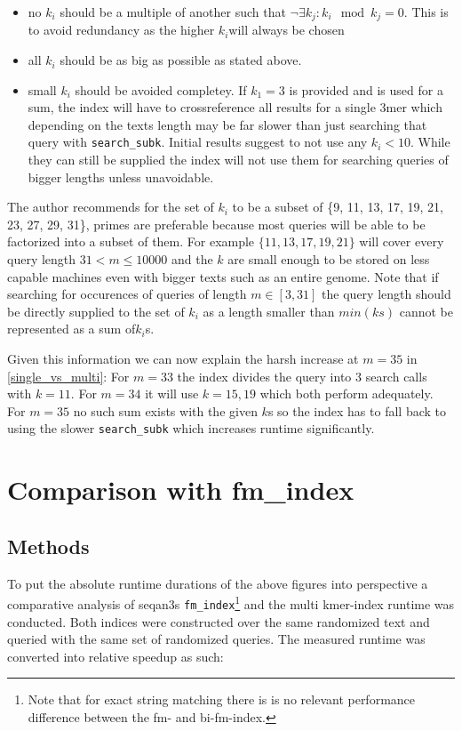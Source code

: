 \begin{itemize}
\item no $k_{i}$ should be a multiple of another such that $\lnot\exists k_{j}:k_{i}\mod k_{j}=0$.
This is to avoid redundancy as the higher $k_{i}$will always be chosen
\item all $k_{i}$ should be as big as possible as stated above.
\item small $k_{i}$ should be avoided completey. If $k_{1}=3$ is provided
and is used for a sum, the index will have to crossreference all results
for a single 3mer which depending on the texts length may be far slower
than just searching that query with \lstinline{search_subk}. Initial
results suggest to not use any $k_{i}<10$. While they can still be supplied
the index will not use them for searching queries of bigger lengths unless unavoidable.
\end{itemize}
The author recommends for the set of $k_{i}$ to be a subset of \{9,
11, 13, 17, 19, 21, 23, 27, 29, 31\}, primes are preferable because
most queries will be able to be factorized into a subset of them.
For example $\{11,13,17,19,21\}$ will cover every query length $31<m\leq10000$
and the $k$ are small enough to be stored on less capable machines
even with bigger texts such as an entire genome. Note that if searching
for occurences of queries of length $m\in[3,31]$ the query length
should be directly supplied to the set of $k_{i}$ as a length smaller
than $min(ks)$ cannot be represented as a sum of$k_{i}$s.

Given this information we can now explain the harsh increase at $m=35$ in \ref{single_vs_multi}: For $m=33$ the index
divides the query into 3 search calls with $k=11$. For $m=34$ it will use $k=15, 19$ which both perform adequately.
For $m=35$ no such sum exists with the given $k$s so the index has to fall back to using the slower \lstinline{search_subk}
which increases runtime significantly.

\section{Comparison with fm_index}
\subsection{Methods}
To put the absolute runtime durations of the above figures into perspective a comparative analysis
of seqan3s \lstinline{fm_index}\footnote{Note that for exact string matching there is is no relevant performance
difference between the fm- and bi-fm-index.} and the multi kmer-index runtime was conducted. Both indices were
constructed over the same randomized text and queried with the same set of randomized queries. The measured runtime was
converted into relative speedup as such:

